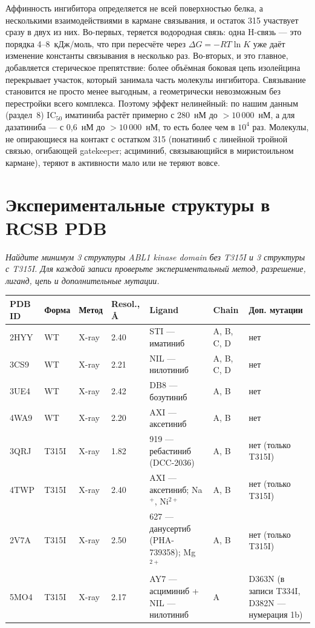 \documentclass[11pt,a4paper]{article}
\newcommand{\instr}[1]{{\small\itshape #1\par}}
\begin{document}
Аффинность ингибитора определяется не всей поверхностью белка, а несколькими
взаимодействиями в кармане связывания, и остаток 315 участвует сразу в двух из них.
Во-первых, теряется водородная связь: одна H-связь --- это порядка 4--8~кДж/моль, что
при пересчёте через $\Delta G = -RT\ln K$ уже даёт изменение константы связывания в
несколько раз. Во-вторых, и это главное, добавляется стерическое препятствие: более
объёмная боковая цепь изолейцина перекрывает участок, который занимала часть молекулы
ингибитора. Связывание становится не просто менее выгодным, а геометрически невозможным
без перестройки всего комплекса. Поэтому эффект нелинейный: по нашим данным (раздел~8)
IC$_{50}$ иматиниба растёт примерно с 280~нМ до $>10\,000$~нМ, а для дазатиниба ---
с 0{,}6~нМ до $>10\,000$~нМ, то есть более чем в $10^4$ раз. Молекулы, не опирающиеся на
контакт с остатком 315 (понатиниб с линейной тройной связью, огибающей gatekeeper;
асциминиб, связывающийся в миристоильном кармане), теряют в активности мало или не
теряют вовсе.

\section{Экспериментальные структуры в RCSB PDB}
\instr{Найдите минимум 3 структуры ABL1 kinase domain без T315I и 3 структуры с T315I.
Для каждой записи проверьте экспериментальный метод, разрешение, лиганд, цепь и
дополнительные мутации.}

\begin{center}
\small
\begin{tabular}{|L{1.3cm}|L{1.25cm}|L{1.5cm}|L{1.4cm}|L{3.1cm}|L{1.9cm}|L{2.6cm}|}
\hline
\textbf{PDB ID} & \textbf{Форма} & \textbf{Метод} & \textbf{Resol., \AA} &
\textbf{Ligand} & \textbf{Chain} & \textbf{Доп. мутации} \\
\hline
2HYY & WT & X-ray & 2.40 & STI --- иматиниб & A, B, C, D & нет \\
\hline
3CS9 & WT & X-ray & 2.21 & NIL --- нилотиниб & A, B, C, D & нет \\
\hline
3UE4 & WT & X-ray & 2.42 & DB8 --- бозутиниб & A, B & нет \\
\hline
4WA9 & WT & X-ray & 2.20 & AXI --- аксетиниб & A, B & нет \\
\hline
3QRJ & T315I & X-ray & 1.82 & 919 --- ребастиниб (DCC-2036) & A, B & нет (только T315I) \\
\hline
4TWP & T315I & X-ray & 2.40 & AXI --- аксетиниб; Na$^+$, Ni$^{2+}$ & A, B &
нет (только T315I) \\
\hline
2V7A & T315I & X-ray & 2.50 & 627 --- данусертиб (PHA-739358); Mg$^{2+}$ & A, B &
нет (только T315I) \\
\hline
5MO4 & T315I & X-ray & 2.17 & AY7 --- асциминиб + NIL --- нилотиниб & A &
D363N (в записи T334I, D382N --- нумерация 1b) \\
\hline
\end{tabular}
\end{center}
\end{document}

